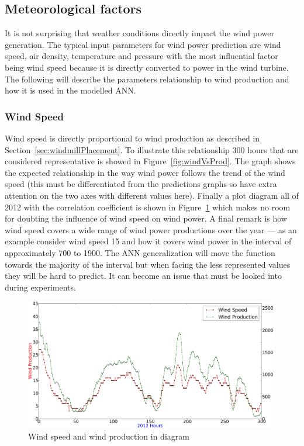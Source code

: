 \subsection{Meteorological factors}
It is not surprising that weather conditions directly impact the wind power generation. The typical input parameters for wind power prediction are wind speed, air density, temperature and pressure \cite{WindPowerGenerationUsingANN} with the most influential factor being wind speed because it is directly converted to power in the wind turbine. The following will describe the parameters relationship to wind production and how it is used in the modelled ANN.

\subsubsection{Wind Speed}
\label{sec:windPowerWindSpeed}
Wind speed is directly proportional to wind production as described in Section~\ref{sec:windmillPlacement}. To illustrate this relationship 300 hours that are considered representative is showed in Figure~\ref{fig:windVsProd}.  The graph shows the expected relationship in the way wind power follows the trend of the wind speed (this must be differentiated from the predictions graphs so have extra attention on the two axes with different values here). Finally a plot diagram all of 2012 with the correlation coefficient is shown in Figure~\ref{fig:windSpeedWindProductionPlot} which makes no room for doubting the influence of wind speed on wind power. A final remark is how wind speed covers a wide range of wind power productions over the year --- as an example consider wind speed 15 and how it covers wind power in the interval of approximately 700 to 1900. The ANN generalization will move the function towards the majority of the interval but when facing the less represented values they will be hard to predict. It can become an issue that must be looked into during experiments.  

\begin{figure}[H]
\centering
\includegraphics[width=0.99\textwidth]{billeder/windSpeedWindProductionPlot.png}
\caption{Wind speed and wind production in diagram}
\label{fig:windSpeedWindProductionPlot}
\end{figure}

